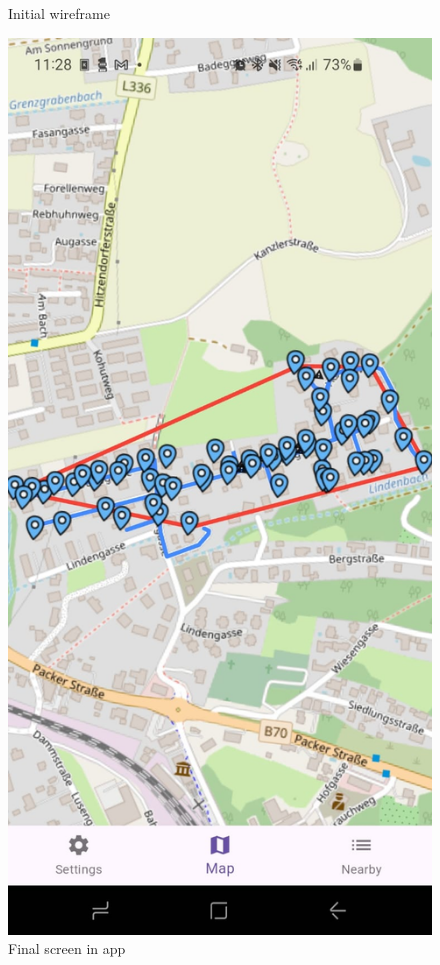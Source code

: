 \begin{figure}[h]
\begin{minipage}{0.3\textwidth}
        \caption{Initial wireframe}
    \end{minipage}
    \hspace{2cm}
    \begin{minipage}{0.3\textwidth}
        \centering
        \includegraphics[width=\textwidth]{images/paul/wireframes/finalMap.jpeg}
        \caption{Final screen in app}
    \end{minipage}
\end{figure}

